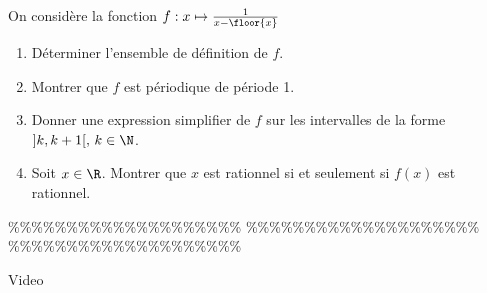 



\begin{exercice}
On considère la fonction $f : x \mapsto \frac{1}{x- \floor{x}}$
\begin{enumerate}
\item Déterminer l'ensemble de définition de $f$. 
\item Montrer que $f$ est périodique de période 1. 
\item Donner une expression simplifier de $f$ sur les intervalles de la forme $]k, k+1[, \, k\in \N$. 
\item Soit $x\in \R$. Montrer que $x$ est rationnel si et seulement si $f(x)$ est rationnel. 
\end{enumerate}
\end{exercice}


\%\%\%\%\%\%\%\%\%\%\%\%\%\%\%\%\%\%\%\%
\%\%\%\%\%\%\%\%\%\%\%\%\%\%\%\%\%\%\%\%
\%\%\%\%\%\%\%\%\%\%\%\%\%\%\%\%\%\%\%\%




\begin{correction}
Video 
\end{correction}